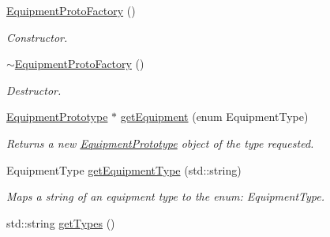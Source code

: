 \begin{DoxyCompactItemize}
\item 
\hypertarget{class_equipment_proto_factory_aa5d0da8b143ac289d645a22b26c37569}{}\hyperlink{class_equipment_proto_factory_aa5d0da8b143ac289d645a22b26c37569}{Equipment\+Proto\+Factory} ()\label{class_equipment_proto_factory_aa5d0da8b143ac289d645a22b26c37569}

\begin{DoxyCompactList}\small\item\em Constructor. \end{DoxyCompactList}\item 
\hypertarget{class_equipment_proto_factory_ad33d994f3281f492aaa3cd305889f780}{}\hyperlink{class_equipment_proto_factory_ad33d994f3281f492aaa3cd305889f780}{$\sim$\+Equipment\+Proto\+Factory} ()\label{class_equipment_proto_factory_ad33d994f3281f492aaa3cd305889f780}

\begin{DoxyCompactList}\small\item\em Destructor. \end{DoxyCompactList}\item 
\hypertarget{class_equipment_proto_factory_a18e0b0214b22722e59f80fef954da6e7}{}\hyperlink{class_equipment_prototype}{Equipment\+Prototype} $\ast$ \hyperlink{class_equipment_proto_factory_a18e0b0214b22722e59f80fef954da6e7}{get\+Equipment} (enum Equipment\+Type)\label{class_equipment_proto_factory_a18e0b0214b22722e59f80fef954da6e7}

\begin{DoxyCompactList}\small\item\em Returns a new \hyperlink{class_equipment_prototype}{Equipment\+Prototype} object of the type requested. \end{DoxyCompactList}\item 
\hypertarget{class_equipment_proto_factory_adccf993cd9070d41d4907bd6c8acb6c8}{}Equipment\+Type \hyperlink{class_equipment_proto_factory_adccf993cd9070d41d4907bd6c8acb6c8}{get\+Equipment\+Type} (std\+::string)\label{class_equipment_proto_factory_adccf993cd9070d41d4907bd6c8acb6c8}

\begin{DoxyCompactList}\small\item\em Maps a string of an equipment type to the enum\+: Equipment\+Type. \end{DoxyCompactList}\item 
\hypertarget{class_equipment_proto_factory_a85965709ee05ef53303c9448b35aea60}{}std\+::string \hyperlink{class_equipment_proto_factory_a85965709ee05ef53303c9448b35aea60}{get\+Types} ()\label{class_equipment_proto_factory_a85965709ee05ef53303c9448b35aea60}


\end{DoxyCompactItemize}
